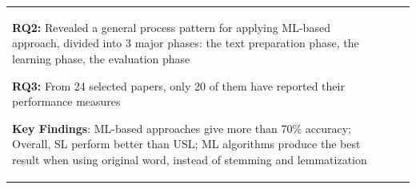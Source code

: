 \documentclass[12pt]{article}
\begin{document}
\begin{table}
\begin{tabular}{|p{2cm}|p{2cm}|p{4cm}|p{5cm}|}
\textbf{RQ2:}\newline
Revealed a general process pattern for applying ML-based approach, divided into 3 major phases: the text preparation phase, the learning phase, the evaluation phase\newline

\textbf{RQ3:}\newline
From 24 selected papers, only 20 of them have reported their performance measures\newline


\textbf{Key Findings}:\newline
ML-based approaches give more than 70\% accuracy;\newline
Overall, SL perform better than USL;\newline
ML algorithms produce the best result when using original word, instead of stemming and lemmatization

\end{tabular}
\hline
\end{table}
\end{document}
